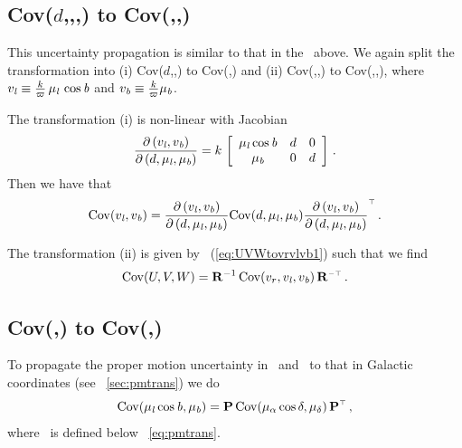 \subsection{Cov($d$,\vrr,\pmll,\pmbb) to Cov(\galU,\galV,\galW)}

This uncertainty propagation is similar to that in the \sectionname\ above. We again split the transformation into (i) Cov($d$,\pmll,\pmbb) to Cov(\vll,\vbb) and (ii) Cov(\vrr,\vll,\vbb) to Cov(\galU,\galV,\galW), where $v_{\it l} \equiv
\frac{k}{\varpi}\,\mu_{\it l}\,\cos{\it b}$ and $v_{\it b} \equiv \frac{k}{\varpi}\mu_{\it b}$.

The transformation (i) is non-linear with Jacobian
\begin{equation}
\frac{\partial \left(v_{\it l},v_{\it b}\right)}{\partial\left(d,\mu_{\it l},\mu_{\it b}\right)}
= k\,\left[ \begin{array}{ccc} \mu_{\it l} \cos {\it b} & d & 0\\\mu_{\it b} & 0 & d\end{array} \right] \,.
\end{equation}
Then we have that
\begin{equation}
\mathrm{Cov}(v_{\it l},v_{\it b}) = \frac{\partial \left(
  v_{\it l},v_{\it b}\right)}{\partial \left(d,\mu_{\it l},\mu_{\it b}\right)}
\mathrm{Cov}(d,\mu_{\it l},\mu_{\it b}) \frac{\partial \left(
  v_{\it l},v_{\it b}\right)}{\partial \left(d,\mu_{\it l},\mu_{\it b}\right)}^{\scriptscriptstyle \top}\,.
\end{equation}

The transformation (ii) is given by
\eqnname~(\ref{eq:UVWtovrvlvb1}) such that we find
\begin{equation}
\mathrm{Cov}(U,V,W) = \mathbf{R}^{-1}\, \mathrm{Cov}(v_r,v_{\it l},v_{\it b}) \, \mathbf{R}^{\scriptscriptstyle -\top}\,.
\end{equation}

\subsection{Cov(\pmra,\pmdec) to Cov(\pmll,\pmbb)}

To propagate the proper motion uncertainty in \ra\ and \dec\ to that
in Galactic coordinates (see \sectionname~\ref{sec:pmtrans}) we do
\begin{equation}
\mathrm{Cov}(\mu_{\it l} \cos {\it b},\mu_{\it b}) = \mbox{\bf P}\, \mathrm{Cov}(\mu_{\alpha} \cos \delta ,\mu_{\delta}) \,\mbox{\bf P}^{\scriptscriptstyle \top}\,,
\end{equation}
where \PP\ is defined below \eqnname~\ref{eq:pmtrans}.




